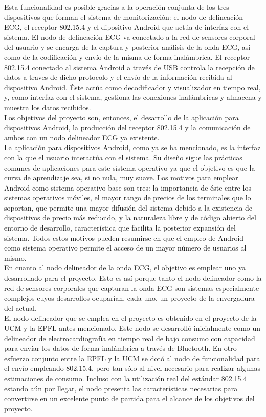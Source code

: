 	Esta funcionalidad es posible gracias a la operación conjunta de los tres dispositivos que forman el sistema de monitorización: el nodo de delineación ECG, el receptor 802.15.4 y el dipositivo Android que actúa de interfaz con el sistema. El nodo de delineación ECG va conectado a la red de sensores corporal del usuario y se encarga de la captura y posterior análisis de la onda ECG, así como de la codificación y envío de la misma de forma inalámbrica. El receptor 802.15.4 conectado al sistema Android a través de USB controla la recepción de datos a traves de dicho protocolo y el envío de la información recibida al dispositivo Android. Éste actúa como decodificador y visualizador en tiempo real, y, como interfaz con el sistema, gestiona las conexiones inalámbricas y almacena y muestra los datos recibidos.\\

	Los objetivos del proyecto son, entonces, el desarrollo de la aplicación para dispositivos Android, la producción del receptor 802.15.4 y la comunicación de ambos con un nodo delineador ECG ya existente.\\

	La aplicación para dispositivos Android, como ya se ha mencionado, es la interfaz con la que el usuario interactúa con el sistema. Su diseño sigue las prácticas comunes de aplicaciones para este sistema operativo ya que el objetivo es que la curva de aprendizaje sea, si no nula, muy suave. Los motivos para emplear Android como sistema operativo base son tres: la importancia de éste entre los sistemas operativos móviles, el mayor rango de precios de los terminales que lo soportan, que permite una mayor difusión del sistema debido a la existencia de dispositivos de precio más reducido, y la naturaleza libre y de código abierto del entorno de desarrollo, característica que facilita la posterior expansión del sistema. Todos estos motivos pueden resumirse en que el empleo de Android como sistema operativo permite el acceso de un mayor número de usuarios al mismo.\\

	En cuanto al nodo delineador de la onda ECG, el objetivo es emplear uno ya desarrollado para el proyecto. Esto es así porque tanto el nodo delineador como la red de sensores corporales que capturan la onda ECG son sistemas especialmente complejos cuyos desarrollos ocuparían, cada uno, un proyecto de la envergadura del actual.\\

	El nodo delineador que se emplea en el proyecto es obtenido en el proyecto de la UCM y la EPFL antes mencionado. Este nodo se desarrolló inicialmente como un delineador de electrocardiografía en tiempo real de bajo consumo con capacidad para envíar los datos de forma inalámbrica a través de Bluetooth. En otro esfuerzo conjunto entre la EPFL y la UCM se dotó al nodo de funcionalidad para el envío empleando 802.15.4, pero tan sólo al nivel necesario para realizar algunas estimaciones de consumo. Incluso con la utilización real del estándar 802.15.4 estando aún por llegar, el nodo presenta las características necesarias para convertirse en un excelente punto de partida para el alcance de los objetivos del proyecto.\\

